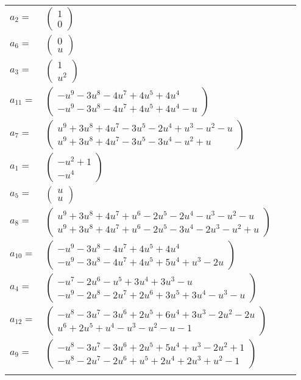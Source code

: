 \documentclass[1p]{elsarticle_modified}
\theoremstyle{definition}
\begin{document}
\begin{tabular}{m{7pt} m{180pt} m{7pt} m{180pt} }
\flushright $a_{2}=$&$\begin{pmatrix}1\\0\end{pmatrix}$ \\
\flushright $a_{6}=$&$\begin{pmatrix}0\\u\end{pmatrix}$ \\
\flushright $a_{3}=$&$\begin{pmatrix}1\\u^2\end{pmatrix}$ \\
\flushright $a_{11}=$&$\begin{pmatrix}- u^9-3 u^8-4 u^7+4 u^5+4 u^4\\- u^9-3 u^8-4 u^7+4 u^5+4 u^4- u\end{pmatrix}$ \\
\flushright $a_{7}=$&$\begin{pmatrix}u^9+3 u^8+4 u^7-3 u^5-2 u^4+u^3- u^2- u\\u^9+3 u^8+4 u^7-3 u^5-3 u^4- u^2+u\end{pmatrix}$ \\
\flushright $a_{1}=$&$\begin{pmatrix}- u^2+1\\- u^4\end{pmatrix}$ \\
\flushright $a_{5}=$&$\begin{pmatrix}u\\u\end{pmatrix}$ \\
\flushright $a_{8}=$&$\begin{pmatrix}u^9+3 u^8+4 u^7+u^6-2 u^5-2 u^4- u^3- u^2- u\\u^9+3 u^8+4 u^7+u^6-2 u^5-3 u^4-2 u^3- u^2+u\end{pmatrix}$ \\
\flushright $a_{10}=$&$\begin{pmatrix}- u^9-3 u^8-4 u^7+4 u^5+4 u^4\\- u^9-3 u^8-4 u^7+4 u^5+5 u^4+u^3-2 u\end{pmatrix}$ \\
\flushright $a_{4}=$&$\begin{pmatrix}- u^7-2 u^6- u^5+3 u^4+3 u^3- u\\- u^9-2 u^8-2 u^7+2 u^6+3 u^5+3 u^4- u^3- u\end{pmatrix}$ \\
\flushright $a_{12}=$&$\begin{pmatrix}- u^8-3 u^7-3 u^6+2 u^5+6 u^4+3 u^3-2 u^2-2 u\\u^6+2 u^5+u^4- u^3- u^2- u-1\end{pmatrix}$ \\
\flushright $a_{9}=$&$\begin{pmatrix}- u^8-3 u^7-3 u^6+2 u^5+5 u^4+u^3-2 u^2+1\\- u^8-2 u^7-2 u^6+u^5+2 u^4+2 u^3+u^2-1\end{pmatrix}$\\&\end{tabular}
\end{document}
